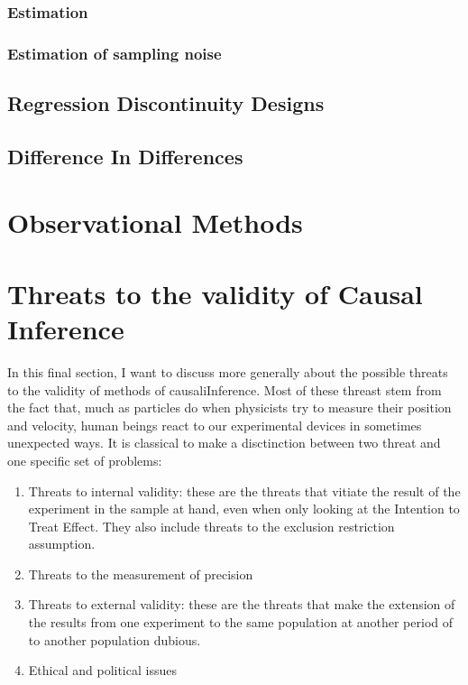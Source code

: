 \documentclass[
]{book}
\providecommand{\tightlist}{%
  \setlength{\itemsep}{0pt}\setlength{\parskip}{0pt}}
\theoremstyle{definition}
\theoremstyle{definition}
\theoremstyle{definition}
\theoremstyle{definition}
\theoremstyle{remark}
\begin{document}
\hypertarget{estimation}{%
\subsection{Estimation}\label{estimation}}

\hypertarget{estimation-of-sampling-noise}{%
\subsection{Estimation of sampling noise}\label{estimation-of-sampling-noise}}

\hypertarget{regression-discontinuity-designs}{%
\section{Regression Discontinuity Designs}\label{regression-discontinuity-designs}}

\hypertarget{difference-in-differences}{%
\section{Difference In Differences}\label{difference-in-differences}}

\hypertarget{sec:OM}{%
\chapter{Observational Methods}\label{sec:OM}}

\hypertarget{sec:threats}{%
\chapter{Threats to the validity of Causal Inference}\label{sec:threats}}

In this final section, I want to discuss more generally about the possible threats to the validity of methods of causaliInference.
Most of these threast stem from the fact that, much as particles do when physicists try to measure their position and velocity, human beings react to our experimental devices in sometimes unexpected ways.
It is classical to make a disctinction between two threat and one specific set of problems:

\begin{enumerate}
\def\labelenumi{\arabic{enumi}.}
\tightlist
\item
  Threats to internal validity: these are the threats that vitiate the result of the experiment in the sample at hand, even when only looking at the Intention to Treat Effect.
  They also include threats to the exclusion restriction assumption.
\item
  Threats to the measurement of precision
\item
  Threats to external validity: these are the threats that make the extension of the results from one experiment to the same population at another period of to another population dubious.
\item
  Ethical and political issues
\end{enumerate}
\end{document}
